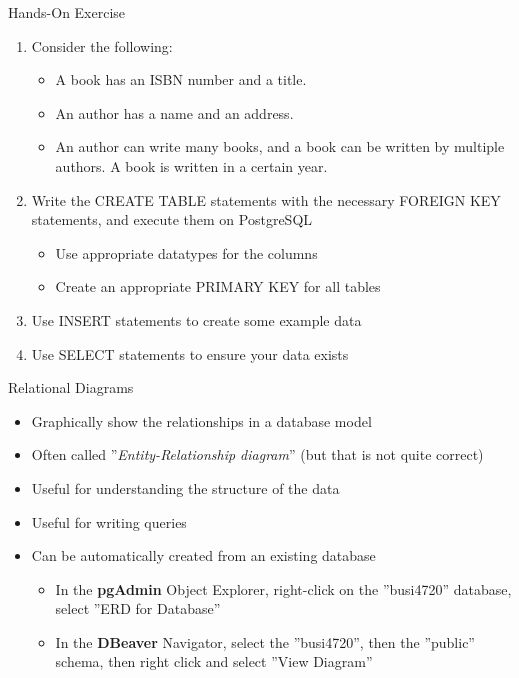 \documentclass[ignorenonframetext,xcolor=x11names]{beamer}
\begin{document}
\begin{frame}{Hands-On Exercise}
\small
\begin{enumerate}
  \item Consider the following:
	\begin{itemize}
	  \item A book has an ISBN number and a title. 
	  \item An author has a name and an address. 
	  \item An author can write many books, and a book can be written by multiple authors. A book is written in a certain year.
	\end{itemize}
  \item Write the CREATE TABLE statements with the necessary FOREIGN KEY statements, and execute them on PostgreSQL
  \begin{itemize}
    \item Use appropriate datatypes for the columns
    \item Create an appropriate PRIMARY KEY for all tables
  \end{itemize}
  \item Use INSERT statements to create some example data
  \item Use SELECT statements to ensure your data exists
\end{enumerate}
\end{frame}

\begin{frame}{Relational Diagrams}
\begin{itemize}
  \item Graphically show the relationships in a database model
  \item Often called ''\emph{Entity-Relationship diagram}'' (but that is not quite correct)
  \item Useful for understanding the structure of the data
  \item Useful for writing queries
  \item Can be automatically created from an existing database
  \begin{itemize}
     \item In the \textbf{pgAdmin} Object Explorer, right-click on the ''busi4720'' database, select ''ERD for Database''
     \item In the \textbf{DBeaver} Navigator, select the ''busi4720'', then the ''public'' schema, then right click and select ''View Diagram''
  \end{itemize}
\end{itemize}
\end{frame}
\end{document}
